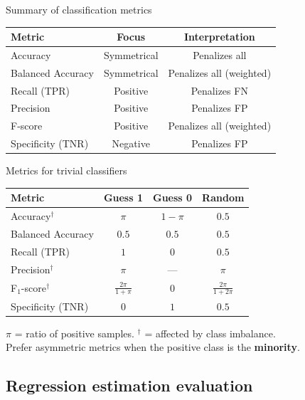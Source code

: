 \begin{frame}{Summary of classification metrics}
  \centering\small
  \begin{tabular}{l c c}
    \toprule
    \textbf{Metric} & \textbf{Focus} & \textbf{Interpretation} \\
    \midrule
    Accuracy           & Symmetrical & Penalizes all \\
    Balanced Accuracy  & Symmetrical & Penalizes all (weighted) \\
    Recall (TPR)       & Positive & Penalizes FN \\
    Precision          & Positive & Penalizes FP \\
    F-score            & Positive & Penalizes all (weighted) \\
    Specificity (TNR)  & Negative & Penalizes FP \\
    \bottomrule
  \end{tabular}
\end{frame}

\begin{frame}{Metrics for trivial classifiers}
  \centering\small
  \begin{tabular}{l c c c}
    \toprule
    \textbf{Metric} & \textbf{Guess 1} & \textbf{Guess 0} & \textbf{Random} \\
    \midrule
    Accuracy$^\dagger$  & $\pi$ & $1 - \pi$ & $0.5$ \\
    Balanced Accuracy   & $0.5$ & $0.5$ & $0.5$ \\
    Recall (TPR)        & $1$ & $0$ & $0.5$ \\
    Precision$^\dagger$ & $\pi$ & --- & $\pi$ \\
    F$_1$-score$^\dagger$ & $\frac{2\pi}{1+\pi}$ & $0$ & $\frac{2\pi}{1+2\pi}$ \\
    Specificity (TNR)   & $0$ & $1$ & $0.5$ \\
    \bottomrule
  \end{tabular}

  \vspace{0.3cm}
  \raggedright
  \small
  $\pi$ = ratio of positive samples. $^\dagger$ = affected by class imbalance.\\
  Prefer asymmetric metrics when the positive class is the \textbf{minority}.
\end{frame}

\subsection{Regression estimation evaluation}

